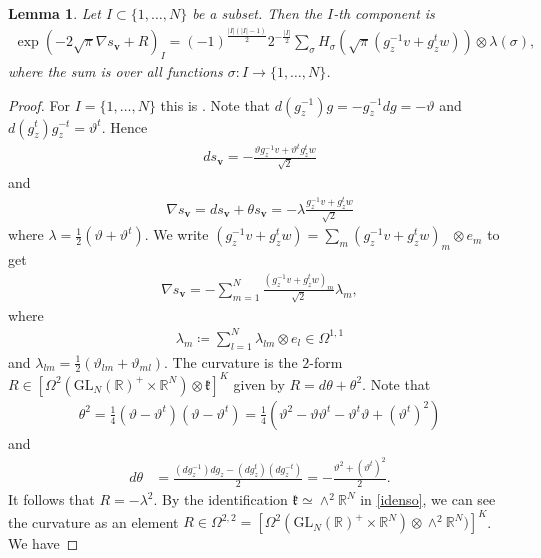 \documentclass[a4paper,11pt]{amsart} %
\newcommand{\8}{\infty}
\newcommand{\vbf}{\mathbf{v}}
\newcommand{\GL}{\mathrm{GL}}
\newcommand{\R}{\mathbb{R}}
\newcommand{\kfrak}{\mathfrak{k}}
\theoremstyle{mytheoremstyle}
\newtheorem{lem}[thm]{Lemma}
\theoremstyle{remark}
\numberwithin{equation}{section}
\begin{document}
\begin{lem} \label{exphermite} Let $I \subset \{1,\dots,N\}$ be a subset. Then the $I$-th component is
\begin{align*}
\exp \left (-2\sqrt{\pi} \nabla s_\vbf+R \right )_I=(-1)^{\frac{\vert I \vert (\vert I \vert -1)}{2}}2^{-\frac{\vert I \vert }{2}}\sum_{\sigma}  H_\sigma\left (\sqrt{\pi}(g_z^{-1}v+g_z^{t}w) \right ) \otimes \lambda(\sigma),
\end{align*}
where the sum is over all functions $\sigma \colon I \longrightarrow \{1, \dots, N\}$.
\end{lem}
\begin{proof} For $I=\{1,\dots,N\}$ this is \cite[Lemma.~4.4]{rbrkmmq}.
Note that $d(g_z^{-1})g=-g_z^{-1}dg=-\vartheta$ and $d(g_z^{t})g_z^{-t}=\vartheta^t$. Hence
\begin{align}
    ds_\vbf=- \frac{\vartheta g_z^{-1}v+\vartheta^tg_z^{t}w}{\sqrt{2}}
\end{align}
and
\begin{align}
    \nabla s_\vbf = ds_\vbf+\theta s_\vbf = -\lambda\frac{g_z^{-1}v+g_z^tw}{\sqrt{2}}
\end{align}
where $\lambda=\frac{1}{2}(\vartheta+\vartheta^t)$. We write $(g_z^{-1}v+g_z^{t}w)=\sum_m(g_z^{-1}v+g_z^{t}w)_m\otimes e_m$ to get
\begin{align}
    \nabla s_\vbf= -\sum_{m=1}^N \frac{(g_z^{-1}v+g_z^{t}w)_m}{\sqrt{2}} \lambda_{m},
\end{align}
where
\begin{align}
    \lambda_m \coloneqq \sum_{l=1}^N \lambda_{lm} \otimes e_l \in \Omega^{1,1}
\end{align}
and $\lambda_{lm} = \frac{1}{2}(\vartheta_{lm}+\vartheta_{ml})$. The curvature is the $2$-form $ R \in [\Omega^2(\GL_N(\R)^+ \times \R^{N}) \otimes \kfrak]^K$ given by $R=d\theta+\theta^2$.
Note that
\begin{align}
    \theta^2 = \frac{1}{4}(\vartheta-\vartheta^t) (\vartheta-\vartheta^t) = \frac{1}{4}(\vartheta^2 -\vartheta \vartheta^t - \vartheta^t \vartheta + (\vartheta^t)^2)
\end{align} and
\begin{align}
    d \theta & = \frac{(d g_z^{-1})dg_z-(dg_z^t)(dg_z^{-t})}{2} = -\frac{\vartheta^2 + (\vartheta^t)^2}{2}.
\end{align} It follows that $R=- \lambda^2$. By the identification $\kfrak \simeq \wedge^2\R^{N}$ in \eqref{idenso}, we can see the curvature as an element $ R \in \Omega^{2,2}=[\Omega^2(\GL_N(\R)^+ \times \R^{N}) \otimes \wedge^2\R^{N})]^K$. We have

\end{proof}
\end{document}
